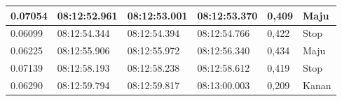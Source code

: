 \begin{longtable}{|l|l|l|l|l|l|}
  0.07054                                                                                                 & 08:12:52.961                                                                                           & 08:12:53.001                                                                                               & 08:12:53.370                                                                                            & 0,409                                              & Maju                                              \\ \hline
  0.06099                                                                                                 & 08:12:54.344                                                                                           & 08:12:54.394                                                                                               & 08:12:54.766                                                                                            & 0,422                                              & Stop                                              \\ \hline
  0.06225                                                                                                 & 08:12:55.906                                                                                           & 08:12:55.972                                                                                               & 08:12:56.340                                                                                            & 0,434                                              & Maju                                              \\ \hline
  0.07139                                                                                                 & 08:12:58.193                                                                                           & 08:12:58.238                                                                                               & 08:12:58.612                                                                                            & 0,419                                              & Stop                                              \\ \hline
  0.06290                                                                                                 & 08:12:59.794                                                                                           & 08:12:59.817                                                                                               & 08:13:00.003                                                                                            & 0,209                                              & Kanan                                             \\ \hline

\end{longtable}
